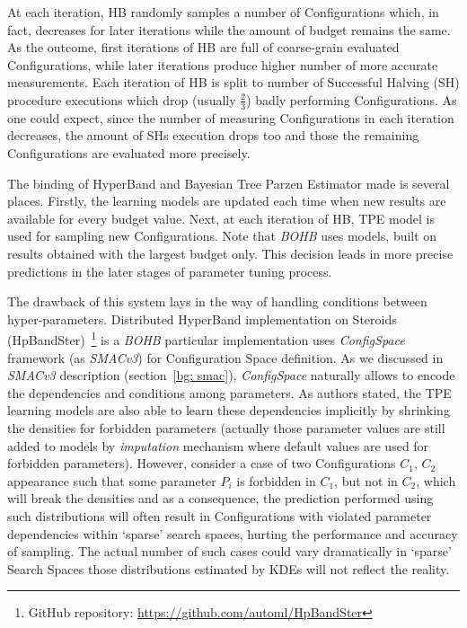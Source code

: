 At each iteration, HB randomly samples a number of Configurations which, in fact, decreases for later iterations while the amount of budget remains the same. As the outcome, first iterations of HB are full of coarse-grain evaluated Configurations, while later iterations produce higher number of more accurate measurements. Each iteration of HB is split to number of Successful Halving (SH) procedure executions which drop (usually $\frac{2}{3}$) badly performing Configurations. As one could expect, since the number of measuring Configurations in each iteration decreases, the amount of SHs execution drops too and those the remaining Configurations are evaluated more precisely.

The binding of HyperBand and Bayesian Tree Parzen Estimator made is several places. Firstly, the learning models are updated each time when new results are available for every budget value. Next, at each iteration of HB, TPE model is used for sampling new Configurations. Note that \textit{BOHB} uses models, built on results obtained with the largest budget only. This decision leads in more precise predictions in the later stages of parameter tuning process.

The drawback of this system lays in the way of handling conditions between hyper-parameters. Distributed HyperBand implementation on Steroids (HpBandSter)~\footnote{GitHub repository: \url{https://github.com/automl/HpBandSter}} is a \textit{BOHB} particular implementation uses \textit{ConfigSpace} framework (as \textit{SMACv3}) for Configuration Space definition. As we discussed in \textit{SMACv3} description (section~\ref{bg: smac}), \textit{ConfigSpace} naturally allows to encode the dependencies and conditions among parameters. As authors stated, the TPE learning models are also able to learn these dependencies implicitly by shrinking the densities for forbidden parameters (actually those parameter values are still added to models by \textit{imputation} mechanism where default values are used for forbidden parameters). However, consider a case of two Configurations $C_1$, $C_2$ appearance such that some parameter $P_i$ is forbidden in $C_1$, but not in $C_2$, which will break the densities and as a consequence, the prediction performed using such distributions will often result in Configurations with violated parameter dependencies within `sparse' search spaces, hurting the performance and accuracy of sampling. The actual number of such cases could vary dramatically in `sparse' Search Spaces those distributions estimated by KDEs will not reflect the reality.


